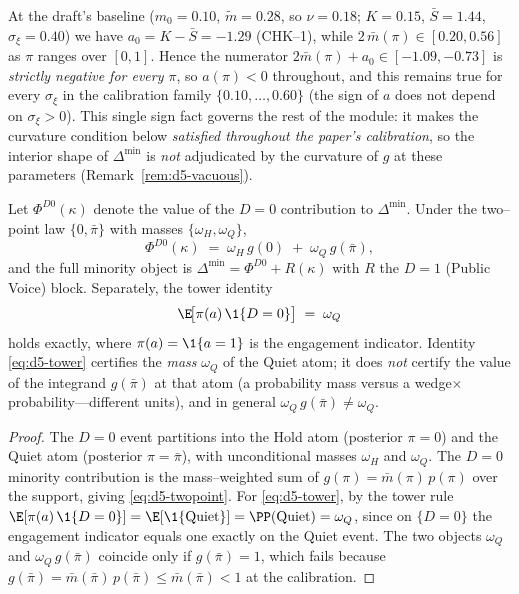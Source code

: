\begin{remark}
\label{rem:d5-anegative}
At the draft's baseline ($m_0=0.10$, $\tilde m=0.28$, so $\nu=0.18$; $K=0.15$,
$\bar S=1.44$, $\sigma_\xi=0.40$) we have $a_0=K-\bar S=-1.29$
(CHK--1), while $2\,\bar m(\pi)\in[0.20,0.56]$ as $\pi$ ranges over $[0,1]$.
Hence the numerator $2\bar m(\pi)+a_0\in[-1.09,-0.73]$ is \emph{strictly
negative for every $\pi$}, so $a(\pi)<0$ throughout, and this remains true for
every $\sigma_\xi$ in the calibration family $\{0.10,\dots,0.60\}$ (the sign of
$a$ does not depend on $\sigma_\xi>0$). %
This single sign fact governs the rest of the module: it makes the curvature
condition below \emph{satisfied throughout the paper's calibration}, so the
interior shape of $\Delta^{\min}$ is \emph{not} adjudicated by the curvature of
$g$ at these parameters (Remark~\ref{rem:d5-vacuous}).
\end{remark}

\begin{lemma}[Two--point representation of the $D=0$ block]\label{lem:d5-twopoint}
Let $\Phi^{D0}(\kappa)$ denote the value of the $D=0$ contribution to
$\Delta^{\min}$. Under the two--point law $\{0,\bar\pi\}$ with masses
$\{\omega_H,\omega_Q\}$,
\begin{equation}\label{eq:d5-twopoint}
  \Phi^{D0}(\kappa)\;=\;\omega_H\,g(0)\;+\;\omega_Q\,g(\bar\pi),
\end{equation}
and the full minority object is $\Delta^{\min}=\Phi^{D0}+R(\kappa)$ with $R$ the
$D=1$ (Public Voice) block. Separately, the tower identity
\begin{equation}\label{eq:d5-tower}
  \E\!\big[\pi(a)\,\1\{D=0\}\big]\;=\;\omega_Q
\end{equation}
holds exactly, where $\pi(a)=\1\{a=1\}$ is the engagement indicator. Identity
\eqref{eq:d5-tower} certifies the \emph{mass} $\omega_Q$ of the Quiet atom; it
does \emph{not} certify the value of the integrand $g(\bar\pi)$ at that atom (a
probability mass versus a wedge$\times$probability---different units), and in
general $\omega_Q\,g(\bar\pi)\neq\omega_Q$.
\end{lemma}

\begin{proof}
The $D=0$ event partitions into the Hold atom (posterior $\pi=0$) and the Quiet
atom (posterior $\pi=\bar\pi$), with unconditional masses $\omega_H$ and
$\omega_Q$. The $D=0$ minority contribution is the mass--weighted sum of
$g(\pi)=\bar m(\pi)\,p(\pi)$ over the support, giving \eqref{eq:d5-twopoint}.
For \eqref{eq:d5-tower}, by the tower rule
$\E[\pi(a)\,\1\{D=0\}]=\E[\1\{\textup{Quiet}\}]=\PP(\textup{Quiet})=\omega_Q$,
since on $\{D=0\}$ the engagement indicator equals one exactly on the Quiet
event. The two objects $\omega_Q$ and $\omega_Q\,g(\bar\pi)$ coincide only if
$g(\bar\pi)=1$, which fails because
$g(\bar\pi)=\bar m(\bar\pi)\,p(\bar\pi)\le\bar m(\bar\pi)<1$ at the calibration.
\end{proof}

